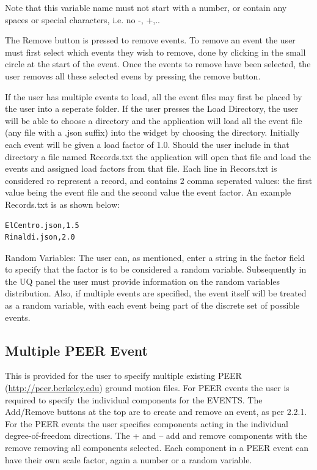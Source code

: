 Note that this variable name must not start with a number, or contain any spaces or special characters, i.e. no -, +,..

The Remove button is pressed to remove events. To remove an event the user must first select
which events they wish to remove, done by clicking in the small circle at the start of the event. Once the events to remove  have been selected, the user removes all these selected evens by pressing the remove button.

If the user has multiple events to load, all the event files may first be placed by the user into a seperate folder. If the user presses the  Load Directory, the user will be able to choose a directory and the application will load all the event file (any file with a .json suffix) into the widget by choosing the directory. Initially each event will be given a load factor of 1.0.  Should the user include in that directory a file named Records.txt the application will open that file and load the events and assigned load factors from that file. Each line in Recors.txt is considered ro represent a record, and contains 2 comma seperated values: the first value being the event file and the second value the event factor. An example Records.txt is as shown below:

\begin{verbatim}
ElCentro.json,1.5
Rinaldi.json,2.0
\end{verbatim}

Random Variables: The user can, as mentioned, enter a string in the factor field to specify that the factor is to be considered a random variable. Subsequently in the UQ panel the user must provide information on the random variables distribution. Also, if multiple events are specified, the event itself will be treated as a random variable, with each event being part of the discrete set of possible events.

\subsection{Multiple PEER Event}
This is provided for the user to specify multiple existing PEER 
(\href{http://peer.berkeley.edu}{http://peer.berkeley.edu}) ground motion files. 
For PEER events the user is required to specify the individual components for the EVENTS. 
The Add/Remove buttons at the top are to create and remove an event, as per 2.2.1. 
For the PEER events the user specifies components acting in the individual degree-of-freedom directions. 
The + and – add and remove components with the remove removing all components selected. 
Each component in a PEER event can have their own scale factor, again a number or a random variable.

